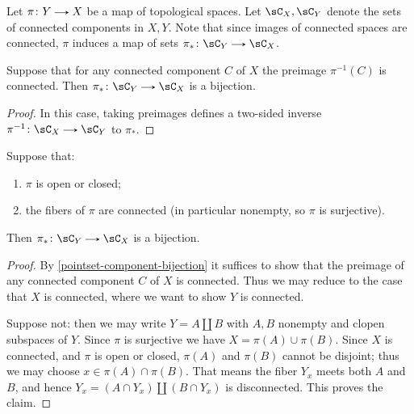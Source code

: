 \begin{nothing}
  \label{pointset}

  Let $\pi \c Y \to X$ be a map of topological spaces. Let $\sC_X,\sC_Y$ denote the sets of connected components in $X,Y$. Note that since images of connected spaces are connected, $\pi$ induces a map of sets $\pi_* \c \sC_Y \to \sC_X$.

  \begin{sublemma}
    \label{pointset-component-bijection}
    Suppose that for any connected component $C$ of $X$ the preimage $\pi^{-1}(C)$ is connected. Then $\pi_* \c \sC_Y \to \sC_X$ is a bijection.

    \begin{proof}
      In this case, taking preimages defines a two-sided inverse $\pi^{-1} \c \sC_X \to \sC_Y$ to $\pi_*$.
    \end{proof}
  \end{sublemma}

  \begin{sublemma}
    \label{pointset-connected-fibers}
    Suppose that:
    \begin{enumerate}
    \item $\pi$ is open or closed; 
    \item the fibers of $\pi$ are connected (in particular nonempty, so $\pi$ is surjective). 
    \end{enumerate}
    Then $\pi_* \c \sC_Y \to \sC_X$ is a bijection.

    \begin{proof}
      By \cref{pointset-component-bijection} it suffices to show that the preimage of any connected component $C$ of $X$ is connected. Thus we may reduce to the case that $X$ is connected, where we want to show $Y$ is connected.

      Suppose not: then we may write $Y = A \amalg B$ with $A,B$ nonempty and clopen subspaces of $Y$. Since $\pi$ is surjective we have $X = \pi(A) \cup \pi(B)$. Since $X$ is connected, and $\pi$ is open or closed, $\pi(A)$ and $\pi(B)$ cannot be disjoint; thus we may choose $x \in \pi(A) \cap \pi(B)$. That means the fiber $Y_x$ meets both $A$ and $B$, and hence $Y_x = (A \cap Y_x) \amalg (B \cap Y_x)$ is disconnected. This proves the claim.
    \end{proof}
  \end{sublemma}
\end{nothing}

